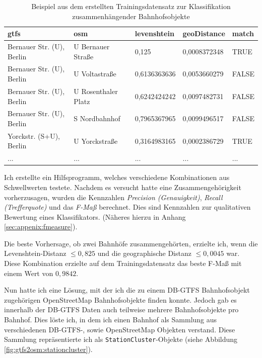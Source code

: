 \begin{table}[]
\small
\centering
\caption{Beispiel aus dem erstellten Trainingsdatensatz zur Klassifikation zusammenhängender Bahnhofsobjekte}
\label{tab:gtfs2osm:trainingset}
\begin{tabular}{|l|l|l|l|l|}
\hline
\textbf{gtfs}             & \textbf{osm}        & \textbf{levenshtein} & \textbf{geoDistance} & \textbf{match} \\ \hline
Bernauer Str. (U), Berlin & U Bernauer Straße   & 0,125                & 0,0008372348         & TRUE           \\ \hline
Bernauer Str. (U), Berlin & U Voltastraße       & 0,6136363636         & 0,0053660279         & FALSE          \\ \hline
Bernauer Str. (U), Berlin & U Rosenthaler Platz & 0,6242424242         & 0,0097482731         & FALSE          \\ \hline
Bernauer Str. (U), Berlin & S Nordbahnhof       & 0,7965367965         & 0,0099496517         & FALSE          \\ \hline
Yorckstr. (S+U), Berlin   & U Yorckstraße       & 0,3164983165         & 0,0002386729         & TRUE           \\ \hline
...                       & ...                 & ...                  & ...                  & ...            \\ \hline
\end{tabular}
\end{table}

Ich erstellte ein Hilfsprogramm, welches verschiedene Kombinationen aus Schwellwerten testete. Nachdem es versucht hatte eine Zusammengehörigkeit vorherzusagen, wurden die Kennzahlen \textit{Precision (Genauigkeit)}, \textit{Recall (Trefferquote)} und das \textit{F-Maß} berechnet. Dies sind Kennzahlen zur qualitativen Bewertung eines Klassifikators. (Näheres hierzu in Anhang \ref{sec:appenix:fmeasure}).

Die beste Vorhersage, ob zwei Bahnhöfe zusammengehörten, erzielte ich, wenn die Levenshtein-Distanz $\leq0,825$ und die geographische Distanz $\leq0,0045$ war. Diese Kombination erzielte auf dem Trainingsdatensatz das beste F-Maß mit einem Wert von $0,9842$.

Nun hatte ich eine Lösung, mit der ich die zu einem DB-GTFS Bahnhofsobjekt zugehörigen OpenStreetMap Bahnhofsobjekte finden konnte. Jedoch gab es innerhalb der DB-GTFS Daten auch teilweise mehrere Bahnhofsobjekte pro Bahnhof.
Dies löste ich, in dem ich einen Bahnhof als Sammlung aus verschiedenen DB-GTFS-, sowie OpenStreetMap Objekten verstand.
Diese Sammlung repräsentierte ich als \texttt{StationCluster}-Objekte (siehe Abbildung \ref{fig:gtfs2osm:stationcluster}).

